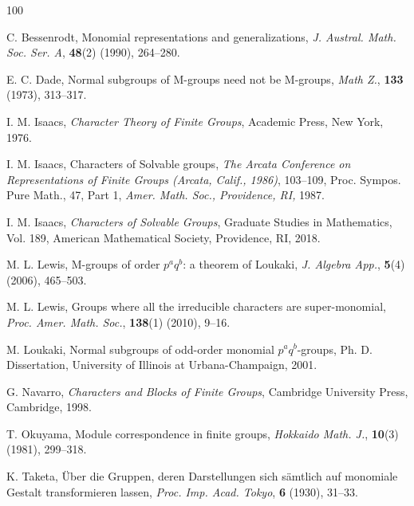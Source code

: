 \documentclass[12pt]{amsart}
\theoremstyle{remark}
\numberwithin{equation}{section}
\begin{document}
\begin{thebibliography}{100}

 C. Bessenrodt, Monomial representations and generalizations,
{\em J. Austral. Math. Soc. Ser. A}, {\bf 48}(2) (1990), 264--280.

E. C. Dade, Normal subgroups of M-groups need not be M-groups,
{\em Math Z.}, {\bf 133} (1973), 313--317.

 I. M. Isaacs,  {\em Character Theory of Finite Groups},
 Academic Press, New York, 1976.

 I. M. Isaacs, Characters of Solvable groups,
{\em The Arcata Conference on Representations of Finite Groups (Arcata, Calif., 1986)},
103--109, Proc. Sympos. Pure Math., 47, Part 1, {\em Amer. Math. Soc., Providence, RI,} 1987.

 I. M. Isaacs, {\em Characters of Solvable Groups},
Graduate Studies in Mathematics, Vol. 189,  American Mathematical Society, Providence, RI, 2018.

M. L. Lewis, M-groups of order $p^{a}q^{b}$: a theorem of Loukaki,
{\em J. Algebra App.},  {\bf 5}(4)(2006), 465--503.

 M. L. Lewis,
Groups where all the irreducible characters are super-monomial,
{\em Proc. Amer. Math. Soc.}, {\bf 138}(1) (2010), 9--16.

M. Loukaki, Normal subgroups of odd-order monomial $p^{a}q^{b}$-groups,
Ph. D. Dissertation, University of Illinois at Urbana-Champaign, 2001.

 G. Navarro, {\em Characters and Blocks of Finite Groups},
Cambridge University Press, Cambridge, 1998.

 T. Okuyama, Module correspondence in finite groups,
{\it Hokkaido Math. J.},  {\bf 10}(3) (1981), 299--318.

K. Taketa, \"Uber die Gruppen, deren Darstellungen sich s\"amtlich auf monomiale Gestalt transformieren lassen,
{\em Proc. Imp. Acad. Tokyo},  {\bf 6} (1930), 31--33.

\end{thebibliography}
\end{document}
